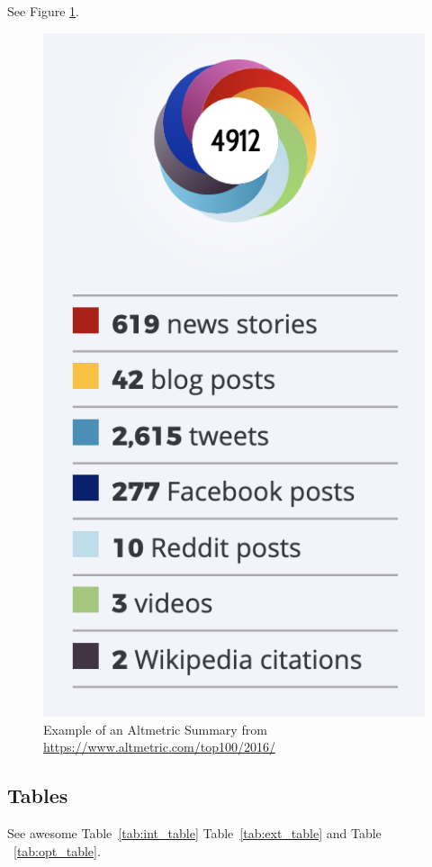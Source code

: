 \documentclass{article}
\begin{document}
See Figure \ref{fig:altmetric}.

\begin{figure} %
    \centering
    \includegraphics{altmetric.png}
    \caption{Example of an Altmetric Summary from \url{https://www.altmetric.com/top100/2016/}}
    \label{fig:altmetric}
\end{figure}

\subsection{Tables}

See awesome Table~\ref{tab:int_table} Table~\ref{tab:ext_table} and Table ~\ref{tab:opt_table}.
\renewcommand{\arraystretch}{1.1} %
\end{document}

